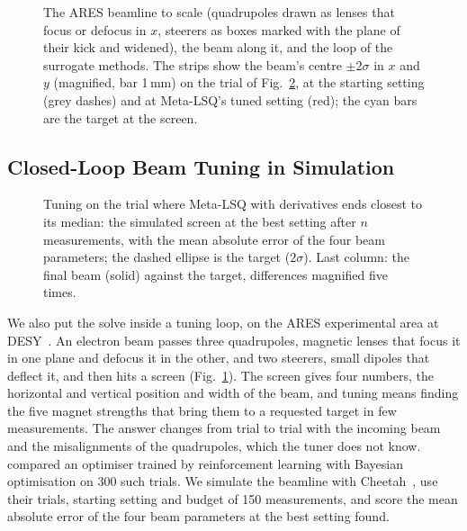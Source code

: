 \documentclass[fullpaper,final]{nldl}
\theoremstyle{plain}
\theoremstyle{definition}
\begin{document}
\begin{figure}[!b]
\centering

\caption{The ARES beamline to scale (quadrupoles drawn as lenses that focus or
defocus in $x$, steerers as boxes marked with the plane of their kick and widened),
the beam along it, and the loop of the surrogate methods. The strips show the beam's
centre $\pm2\sigma$ in $x$ and $y$ (magnified, bar 1\,mm) on the trial of
Fig.~\ref{fig:ares-screens}, at the starting setting (grey dashes) and at
Meta-LSQ's tuned setting (red); the cyan bars are the target at the screen.}
\label{fig:ares-scheme}
\end{figure}

\subsection{Closed-Loop Beam Tuning in Simulation}
\label{sec:exp-ares}

\begin{figure}[tb]
\centering

\caption{Tuning on the trial where Meta-LSQ with derivatives ends closest to its
median: the simulated screen at the best setting after $n$ measurements, with the
mean absolute error of the four beam parameters; the dashed ellipse is the target
($2\sigma$). Last column: the final beam (solid) against the target, differences
magnified five times.}
\label{fig:ares-screens}
\end{figure}

We also put the solve inside a tuning loop, on the ARES experimental area at
DESY~\citep{panofski2021ares}. An electron beam passes three quadrupoles, magnetic
lenses that focus it in one plane and defocus it in the other, and two steerers,
small dipoles that deflect it, and then hits a screen
(Fig.~\ref{fig:ares-scheme}). The screen gives four numbers, the horizontal and
vertical position and width of the beam, and tuning means finding the five magnet
strengths that bring them to a requested target in few measurements. The answer
changes from trial to trial with the incoming beam and the misalignments of the
quadrupoles, which the tuner does not know. \citet{kaiser2024rlbo} compared an
optimiser trained by reinforcement learning with Bayesian optimisation on 300 such
trials. We simulate the beamline with Cheetah~\citep{kaiser2024cheetah}, use their
trials, starting setting and budget of 150 measurements, and score the mean
absolute error of the four beam parameters at the best setting found.
\end{document}
